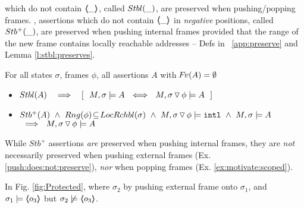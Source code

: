  

 which do  not contain  $\langle\!\!\langle \_ \rangle\!\!\rangle$, called   ${Stbl( \_ )}$, are preserved when pushing/popping  frames.  
, assertions which do  not contain $\langle\!\!\langle \_ \rangle\!\!\rangle$ in \emph{negative} positions, called ${Stb^+( \_ )}$,  are preserved when pushing  {internal} frames provided that the range of the new frame contains locally reachable addresses -- 
\cf  Defs   in \A\ \ref{app:preserve} and Lemma \ref{l:stbl:preserves}.

\begin{lemma}
For all  states $\sigma$, frames $\phi$,   all assertions $A$ with  ${\hspace{-1pt}F\hspace{-1pt}}v(A)=\emptyset $
\label{l:preserve:asrt}
\label{l:stbl:preserves} 
\begin{itemize}
\item 
$\Stable{A} \  \ \  \Longrightarrow  \  \ \  [\ \ M, \sigma \models A \ \ \Longleftrightarrow \ \  M,{\PushSLong \phi \sigma} \models A\ \ ]$
\item 
\label{l:preserve:asrt:two}
${Stb^+( A )}   \ \wedge    \ Rng(\phi)\!\subseteq\! LocRchbl(\sigma)\ \wedge\  M, { \sigma \, {\triangledown}\, \phi} \models  \mbox{\normalfont{\texttt{intl}}}\  \wedge  \ M, \sigma \models A $
$\  \ \Longrightarrow \  \ M,{ \sigma \, {\triangledown}\, \phi} \models A\ $
\end{itemize}
\end{lemma}


While $Stb^+$ assertions \emph{are} preserved  when pushing  internal frames,   they  are \emph{not} necessarily preserved when pushing  external frames   (\cf  Ex. \ref{push:does:not:preserve}), \emph{nor} when popping frames   (\cf Ex. \ref{ex:motivate:scoped}). 

 
\begin{example}
\label{push:does:not:preserve}
In    Fig. \ref{fig:Protected}, where $\sigma_2$ by pushing external frame onto $\sigma_1$, and 
$\sigma_1 \models \langle\!\!\langle o_3 \rangle\!\!\rangle$ but $\sigma_2 \not\models \langle\!\!\langle o_3 \rangle\!\!\rangle$.
\end{example}
 

